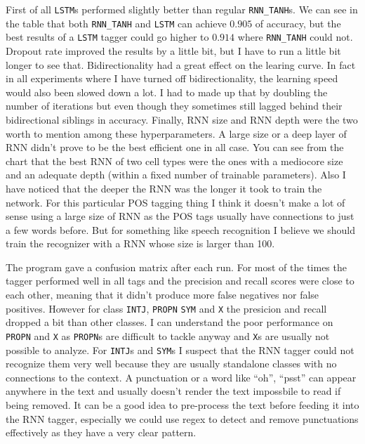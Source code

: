 \documentclass[11pt]{article} %
\begin{document}
First of all \verb|LSTM|s performed slightly better than regular \verb|RNN_TANH|s. We can see in the table that both \verb|RNN_TANH| and \verb|LSTM| can achieve $0.905$ of accuracy, but the best results of a \verb|LSTM| tagger could go higher to $0.914$ where \verb|RNN_TANH| could not. Dropout rate improved the results by a little bit, but I have to run a little bit longer to see that. Bidirectionality had a great effect on the learing curve. In fact in all experiments where I have turned off bidirectionality, the learning speed would also been slowed down a lot. I had to made up that by doubling the number of iterations but even though they sometimes still lagged behind their bidirectional siblings in accuracy. Finally, RNN size and RNN depth were the two worth to mention among these hyperparameters. A large size or a deep layer of RNN didn't prove to be the best efficient one in all case. You can see from the chart that the best RNN of two cell types were the ones with a mediocore size and an adequate depth (within a fixed number of trainable parameters). Also I have noticed that the deeper the RNN was the longer it took to train the network. For this particular POS tagging thing I think it doesn't make a lot of sense using a large size of RNN as the POS tags usually have connections to just a few words before. But for something like speech recognition I believe we should train the recognizer with a RNN whose size is larger than 100.

The program gave a confusion matrix after each run. For most of the times the tagger performed well in all tags and the precision and recall scores were  close to each other, meaning that it didn't produce more false negatives nor false positives. However for class \verb|INTJ|, \verb|PROPN| \verb|SYM| and \verb|X| the presicion and recall dropped a bit than other classes. I can understand the poor performance on \verb|PROPN| and \verb|X| as \verb|PROPN|s are difficult to tackle anyway and \verb|X|s are usually  not possible to analyze. For \verb|INTJ|s and \verb|SYM|s I suspect that the RNN tagger could not recognize them very well because they are usually standalone classes with no connections to the context. A punctuation or a word like ``oh'', ``psst'' can appear anywhere in the text and usually doesn't render the text impossbile to read if being removed.  It can be a good idea to pre-process the text before feeding it into the RNN tagger, especially we could use regex to detect and remove punctuations effectively as they have a very clear pattern.
\end{document}
